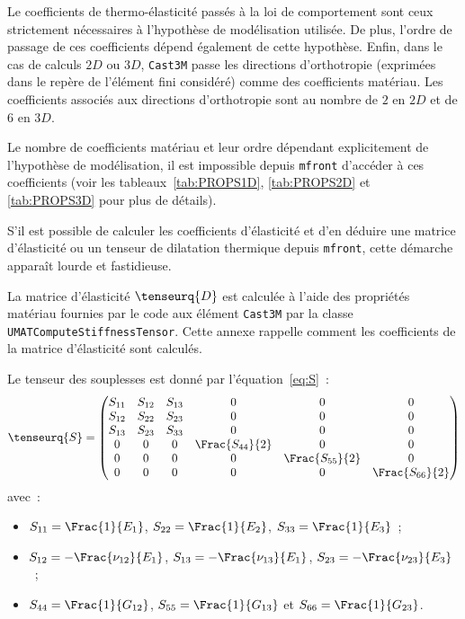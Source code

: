 \documentclass[rectoverso,pleiades,pstricks,leqno,anti]{texmf/note_technique_2010}
\newcommand{\mfront}{\texttt{mfront}}
\newcommand{\castem}{\texttt{Cast3M}}
\begin{document}
Le coefficients de thermo-élasticité passés à la loi de comportement
sont ceux strictement nécessaires à l'hypothèse de modélisation
utilisée. De plus, l'ordre de passage de ces coefficients dépend
également de cette hypothèse. Enfin, dans le cas de calculs \(2D\) ou
\(3D\), \castem{} passe les directions d'orthotropie (exprimées dans le
repère de l'élément fini considéré) comme des coefficients matériau. Les
coefficients associés aux directions d'orthotropie sont au nombre de
\(2\) en \(2D\) et de \(6\) en \(3D\).

Le nombre de coefficients matériau et leur ordre dépendant
explicitement de l'hypothèse de modélisation, il est impossible depuis
\mfront{} d'accéder à ces coefficients (voir les
tableaux~\ref{tab:PROPS1D}, \ref{tab:PROPS2D} et \ref{tab:PROPS3D}
pour plus de détails).

S'il est possible de calculer les coefficients d'élasticité et d'en
déduire une matrice d'élasticité ou un tenseur de dilatation thermique
depuis \mfront{}, cette démarche apparaît lourde et fastidieuse.

La matrice d'élasticité \(\tenseurq{D}\) est calculée à l'aide des
propriétés matériau fournies par le code aux élément \castem{} par la
classe {\tt UMAT\-Compute\-Stiff\-ness\-Tensor}. Cette annexe rappelle
comment les coefficients de la matrice d'élasticité sont calculés.

Le tenseur des souplesses est donné par l'équation~\eqref{eq:S}~:
\[
\tenseurq{S}=
\begin{pmatrix}
  S_{11} & S_{12} & S_{13} & 0 & 0 & 0 \\
  S_{12} & S_{22} & S_{23} & 0 & 0 & 0 \\
  S_{13} & S_{23} & S_{33} & 0 & 0 & 0 \\
  0 & 0 & 0 & \Frac{S_{44}}{2} & 0  & 0 \\
  0 & 0 & 0 & 0               & \Frac{S_{55}}{2} & 0 \\
  0 & 0 & 0 & 0               & 0 & \Frac{S_{66}}{2} \\
\end{pmatrix}
\]
avec~:
\begin{minipage}[t]{0.8\linewidth}
  \begin{itemize}
  \item \(S_{11} = \Frac{1}{E_{1}}\), \(S_{22} = \Frac{1}{E_{2}}\), \(S_{33} = \Frac{1}{E_{3}}\)~;
  \item \(S_{12} = -\Frac{\nu_{12}}{E_{1}}\), \(S_{13} = -\Frac{\nu_{13}}{E_{1}}\), \(S_{23} = -\Frac{\nu_{23}}{E_{3}}\)~;
  \item \(S_{44} = \Frac{1}{G_{12}}\),  \(S_{55} = \Frac{1}{G_{13}}\) et \(S_{66} = \Frac{1}{G_{23}}\).
  \end{itemize}
\end{minipage}
\end{document}
